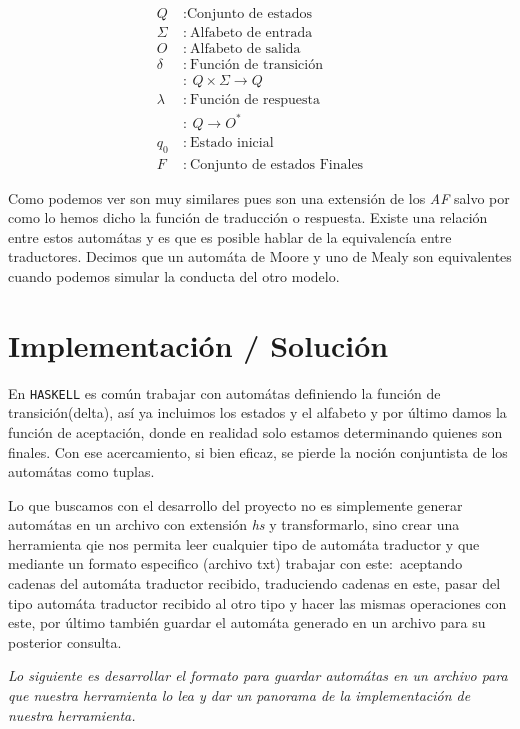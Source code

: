 \documentclass[11pt,letterpaper]{article}
\begin{document}
\begin{multicols}{2}
    \begin{align*}
    Q\ &: \text{Conjunto de estados}\\
    \Sigma\ &:\  \text{Alfabeto de entrada}\\
    O\ &:\  \text{Alfabeto de salida}\\
    \delta\ &:\  \text{Función de transición}\\
    &:\  Q\times \Sigma \rightarrow Q\\
    \lambda &:\  \text{Función de respuesta}\\
    &:\  Q\rightarrow O^*\\
    q_0\ &:\  \text{Estado inicial}\\
    F\ &:\  \text{Conjunto de estados Finales}
    \end{align*}

    Como podemos ver son muy similares pues son una extensión de los {\it AF}
    salvo por como lo hemos dicho la función de traducción o respuesta. Existe
    una relación entre estos automátas y es que es posible hablar de la equivalencía
    entre traductores. Decimos que un automáta de Moore y uno de Mealy son equivalentes
    cuando podemos simular la conducta del otro modelo.
    
  \section{Implementación / Solución}
  
  En {\tt HASKELL} es común trabajar con automátas definiendo la función
  de transición(delta), así ya incluimos los estados y el alfabeto y
  por último damos la función de aceptación, donde en realidad solo
  estamos determinando quienes son finales. Con ese acercamiento,
  si bien eficaz, se pierde la noción conjuntista de los automátas como
  tuplas.
  
  Lo que buscamos con el desarrollo del proyecto no es simplemente
  generar automátas en un archivo con extensión {\it hs} y transformarlo,
  sino crear una herramienta qie nos permita leer cualquier tipo de automáta
  traductor y que mediante un formato especifico (archivo txt) trabajar
  con este:\  aceptando cadenas del automáta traductor recibido,
  traduciendo cadenas en este, pasar del tipo automáta traductor recibido
  al otro tipo y hacer las mismas operaciones con este, por último también
  guardar el automáta generado en un archivo para su posterior consulta.

  {\it Lo siguiente es desarrollar el formato para guardar automátas en un
    archivo para que nuestra herramienta lo lea y dar un panorama de la
    implementación de nuestra herramienta.}
  

\end{multicols}
\end{document}
